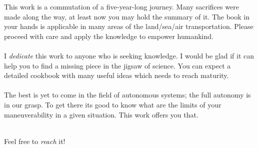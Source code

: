 \noindent This work is a commutation of a five-year-long journey. Many sacrifices were made along the way, at least now you may hold the summary of it. The book in your hands is applicable in many areas of the land/sea/air transportation. Please proceed with care and apply the knowledge to empower humankind.  
\\ \\
I \emph{dedicate} this work to anyone who is seeking knowledge. I would be glad if it can help you to find a missing piece in the jigsaw of science. You can expect a detailed cookbook with many useful ideas which needs to reach maturity. 
\\\\
The best is yet to come in the field of autonomous systems; the full autonomy is in our grasp. To get there its good to know what are the limits of your maneuverability in a given situation. This work offers you that.
\\ 
\\
\begin{flushright}
Feel free to \emph{reach} it!
\end{flushright}